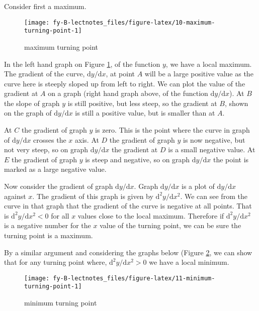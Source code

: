 \documentclass[
  11pt,
  oneside]{book}
\newcommand{\slide}{}
\theoremstyle{definition}
\theoremstyle{definition}
\theoremstyle{definition}
\theoremstyle{definition}
\theoremstyle{remark}
\begin{document}
Consider first a maximum.

\begin{figure}

{\centering \texttt{[image: fy-B-lectnotes\_files/figure-latex/10-maximum-turning-point-1]} 

}

\caption{maximum turning point}\label{fig:10-maximum-turning-point}
\end{figure}

In the left hand graph on Figure \ref{fig:10-maximum-turning-point}, of the function \(y\), we have a local maximum. The gradient of the curve, \(\mathrm{d}y/\mathrm{d} x\), at point \(A\) will be a large positive value as the curve here is steeply sloped up from left to right. We can plot the value of the gradient at \(A\) on a graph (right hand graph above, of the function \(\mathrm{d}y/\mathrm{d} x\)). At \(B\) the slope of graph \(y\) is still positive, but less steep, so the gradient at \(B\), shown on the graph of \(\mathrm{d}y/\mathrm{d} x\) is still a positive value, but is smaller than at \(A\).

At \(C\) the gradient of graph \(y\) is zero. This is the point where the curve in graph of \(\mathrm{d}y/\mathrm{d} x\) crosses the \(x\) axis. At \(D\) the gradient of graph \(y\) is now negative, but not very steep, so on graph \(\mathrm{d}y/\mathrm{d} x\) the gradient at \(D\) is a small negative value. At \(E\) the gradient of graph \(y\) is steep and negative, so on graph \(\mathrm{d}y/\mathrm{d} x\) the point is marked as a large negative value.

Now consider the gradient of graph \(\mathrm{d}y/\mathrm{d} x\). Graph \(\mathrm{d}y/\mathrm{d} x\) is a plot of \(\mathrm{d}y/\mathrm{d} x\) against \(x\). The gradient of this graph is given by \(\mathrm{d}^{2}y/\mathrm{d} x^2\). We can see from the curve in that graph that the gradient of the curve is negative at all points. That is \(\mathrm{d}^{2}y/\mathrm{d} x^2<0\) for all \(x\) values close to the local maximum. Therefore if \(\mathrm{d}^{2}y/\mathrm{d} x^2\) is a negative number for the \(x\) value of the turning point, we can be sure the turning point is a maximum.
\slide

By a similar argument and considering the graphs below (Figure \ref{fig:11-minimum-turning-point}, we can show that for any turning point where, \(\mathrm{d}^{2}y/\mathrm{d} x^2>0\) we have a local minimum.

\begin{figure}

{\centering \texttt{[image: fy-B-lectnotes\_files/figure-latex/11-minimum-turning-point-1]} 

}

\caption{minimum turning point}\label{fig:11-minimum-turning-point}
\end{figure}
\slide
\end{document}
